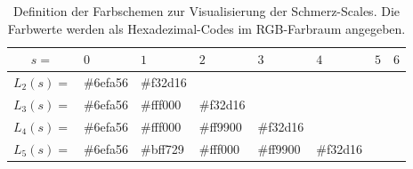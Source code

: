 \begin{table}[h]
\footnotesize
\centering
\caption[Definition der Farbschemen zur Visualisierung der Schmerz-Scales]{Definition der Farbschemen zur Visualisierung der Schmerz-Scales. Die Farbwerte werden als Hexadezimal-Codes im RGB-Farbraum angegeben.}
\label{tab:color_shemes}
\begin{tabular}{@{}clllllll@{}}
\toprule
              $s=$         & $0$                                                     & $1$                                                     & $2$                                                     & $3$                                                     & $4$                                                     & $5$                                                     & $6$                                                     \\ \midrule
\multicolumn{1}{l|}{$L_2(s) = $} & \multicolumn{1}{l|}{\cellcolor[HTML]{6EFA56}\#6efa56} & \multicolumn{1}{l|}{\cellcolor[HTML]{F32D16}\#f32d16} &                                                       &                                                       &                                                       &                                                       &                                                       \\ \cmidrule(lr){2-4}
\multicolumn{1}{l|}{$L_3(s) = $} & \multicolumn{1}{l|}{\cellcolor[HTML]{6EFA56}\#6efa56} & \multicolumn{1}{l|}{\cellcolor[HTML]{FFF000}\#fff000} & \multicolumn{1}{l|}{\cellcolor[HTML]{F32D16}\#f32d16} &                                                       &                                                       &                                                       &                                                       \\ \cmidrule(lr){2-5}
\multicolumn{1}{l|}{$L_4(s) = $} & \multicolumn{1}{l|}{\cellcolor[HTML]{6EFA56}\#6efa56} & \multicolumn{1}{l|}{\cellcolor[HTML]{FFF000}\#fff000} & \multicolumn{1}{l|}{\cellcolor[HTML]{FF9900}\#ff9900} & \multicolumn{1}{l|}{\cellcolor[HTML]{F32D16}\#f32d16} &       &                                                       &                                                       \\ \cmidrule(lr){2-6}
\multicolumn{1}{l|}{$L_5(s) = $} & \multicolumn{1}{l|}{\cellcolor[HTML]{6EFA56}\#6efa56} & \multicolumn{1}{l|}{\cellcolor[HTML]{BFF729}\#bff729} & \multicolumn{1}{l|}{\cellcolor[HTML]{FFF000}\#fff000} & \multicolumn{1}{l|}{\cellcolor[HTML]{FF9900}\#ff9900} & \multicolumn{1}{l|}{\cellcolor[HTML]{F32D16}\#f32d16} &                                                       &                                                       \\ \cmidrule(lr){2-7}

\end{tabular}
\end{table}
